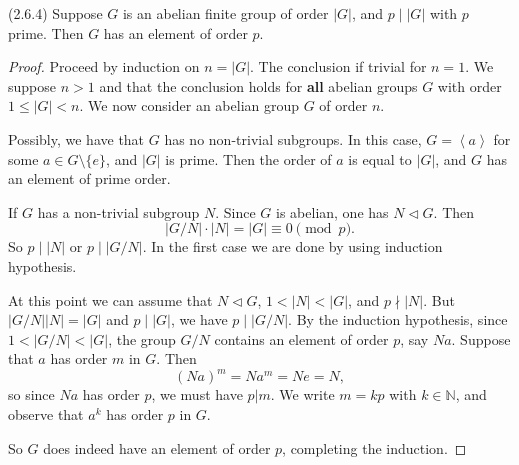 \begin{theorem}
	(2.6.4)
	Suppose $G$ is an abelian finite group of order $|G|$, and $p \mid |G|$ with $p$ prime. Then $G$ has an element of order $p$.
\end{theorem}
\begin{proof}
	Proceed by induction on $n = |G|$. The conclusion if trivial for $n = 1$. We suppose $n > 1$ and that the conclusion holds for \textbf{all} abelian groups $G$ with order $1\le |G|<n$. We now consider an abelian group $G$ of order $n$.

	Possibly, we have that $G$ has no non-trivial subgroups. In this case, $G = \left\langle a \right\rangle $ for some $a \in G\setminus \{e\} $, and $|G|$ is prime. Then the order of $a$ is equal to $|G|$, and $G$ has an element of prime order.

	If $G$ has a non-trivial subgroup $N$. Since $G$ is abelian, one has $N \triangleleft G$. Then \[
		|G / N| \cdot |N| = |G| \equiv 0 \pmod p
	.\] 
	So $p \mid |N|$ or $p \mid |G / N|$. In the first case we are done by using induction hypothesis. 

	At this point we can assume that $N \triangleleft  G$, $1 < |N| < |G|$, and $p \nmid |N|$. But $|G / N| |N| = |G|$ and $p \mid  |G|$, we have $p \mid |G / N|$. By the induction hypothesis, since $1 < |G / N|< |G|$, the group  $G / N$ contains an element of order $p$, say $Na$.
	Suppose that $a$ has order $m$ in $G$. Then \[
		(Na)^m = N a^m = Ne = N
	,\] 
	so since $Na$ has order $p$, we must have $p | m$. We write $m  = k p$ with $ k \in \mathbb{N}$, and observe that $a^k$ has order $p$ in $G$.

	So $G$ does indeed have an element of order $p$, completing the induction.
\end{proof}

